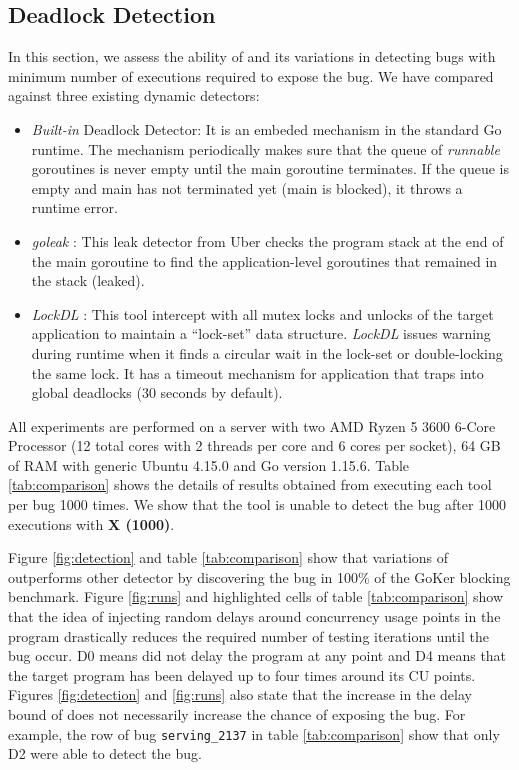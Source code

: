 \subsection{Deadlock Detection}
\label{sec:dl_evaluation}
In this section, we assess the ability of \goat and its variations in detecting bugs with minimum number of executions required to expose the bug.
%
We have compared \goat against three existing dynamic detectors:
\begin{itemize}
  \item \textit{Built-in} Deadlock Detector: It is an embeded mechanism in the standard Go runtime. The mechanism periodically makes sure that the queue of \textit{runnable} goroutines is never empty until the main goroutine terminates. If the queue is empty and main has not terminated yet (\ie main is blocked), it throws a runtime error.
  \item \textit{goleak} \cite{goleak}: This leak detector from Uber checks the program stack at the end of the main goroutine to find the application-level goroutines that remained in the stack (\ie leaked).
  \item \textit{LockDL} \cite{lockdl}: This tool intercept with all mutex locks and unlocks of the target application to maintain a ``lock-set'' data structure. \textit{LockDL} issues warning during runtime when it finds a circular wait in the lock-set or double-locking the same lock. It has a timeout mechanism for application that traps into global deadlocks (30 seconds by default).
\end{itemize}

All experiments are performed on a server with two AMD Ryzen 5 3600 6-Core Processor (12 total cores with 2 threads per core and 6 cores per socket), 64 GB of RAM with generic Ubuntu 4.15.0 and Go version 1.15.6.
%
Table \ref{tab:comparison} shows the details of results obtained from executing each tool per bug 1000 times.
%
We show that the tool is unable to detect the bug after 1000 executions with \textbf{X (1000)}.
%

%
Figure \ref{fig:detection} and table \ref{tab:comparison} show that variations of \goat outperforms other detector by discovering the bug in 100\% of the GoKer blocking benchmark.
%
Figure \ref{fig:runs} and highlighted cells of table \ref{tab:comparison} show that the idea of injecting random delays around concurrency usage points in the program drastically reduces the required number of testing iterations until the bug occur.
%
D0 means \goat did not delay the program at any point and D4 means that the target program has been delayed up to four times around its CU points.
%
Figures \ref{fig:detection} and \ref{fig:runs} also state that the increase in the delay bound of \goat does not necessarily increase the chance of exposing the bug.
%
For example, the row of bug \texttt{serving\_2137} in table \ref{tab:comparison} show that only \goat D2 were able to detect the bug.


